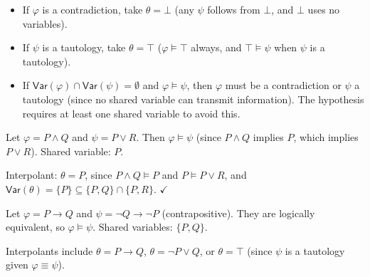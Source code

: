 \begin{remark}\label{rem:trivial}
\begin{itemize}
  \item If $\varphi$ is a contradiction, take $\theta = \bot$ (any $\psi$ follows
        from $\bot$, and $\bot$ uses no variables).
  \item If $\psi$ is a tautology, take $\theta = \top$ ($\varphi \models \top$
        always, and $\top \models \psi$ when $\psi$ is a tautology).
  \item If $\mathsf{Var}(\varphi) \cap \mathsf{Var}(\psi) = \emptyset$ and
        $\varphi \models \psi$, then $\varphi$ must be a contradiction or $\psi$
        a tautology (since no shared variable can transmit information). The
        hypothesis requires at least one shared variable to avoid this.
\end{itemize}
\end{remark}

\begin{example}
Let $\varphi = P \wedge Q$ and $\psi = P \vee R$. Then $\varphi \models \psi$
(since $P \wedge Q$ implies $P$, which implies $P \vee R$).
Shared variable: $P$.

Interpolant: $\theta = P$, since $P \wedge Q \models P$ and $P \models P \vee R$,
and $\mathsf{Var}(\theta) = \{P\} \subseteq \{P,Q\} \cap \{P,R\}$. $\checkmark$
\end{example}

\begin{example}
Let $\varphi = P \rightarrow Q$ and $\psi = \neg Q \rightarrow \neg P$
(contrapositive). They are logically equivalent, so $\varphi \models \psi$.
Shared variables: $\{P,Q\}$.

Interpolants include $\theta = P \rightarrow Q$, $\theta = \neg P \vee Q$, or
$\theta = \top$ (since $\psi$ is a tautology given $\varphi \equiv \psi$).
\end{example}

